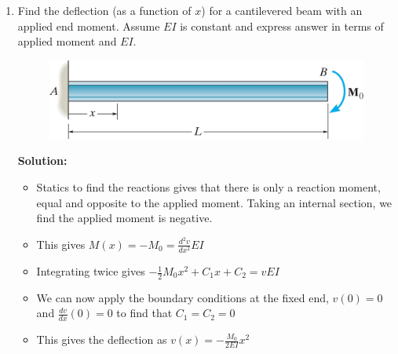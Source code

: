 \documentclass[12pt, oneside]{article}
\begin{document}
\begin{enumerate}
	\item %
		Find the deflection (as a function of $x$) for a cantilevered beam with an applied end moment.
		Assume $EI$ is constant and express answer in terms of applied moment and $EI$.
		\begin{figure}[H]
			\centering
			\includegraphics[width=0.6\linewidth]{12-6}
		\end{figure}
			\textbf{Solution:}
			\begin{itemize}
				\item Statics to find the reactions gives that there is only a reaction moment, equal and opposite to the applied moment.
					Taking an internal section, we find the applied moment is negative.
				\item This gives $M(x) = -M_0 = \frac{d^2 v}{dx^2}EI$
				\item Integrating twice gives $-\frac{1}{2}M_0x^2 + C_1 x + C_2 = v EI$
				\item We can now apply the boundary conditions at the fixed end, $v(0) = 0$ and $\frac{dv}{dx}(0) = 0$ to find that $C_1 = C_2 = 0$
				\item This gives the deflection as $v(x) = -\frac{M_0}{2EI}x^2$
			\end{itemize}


\end{enumerate}
\end{document}
